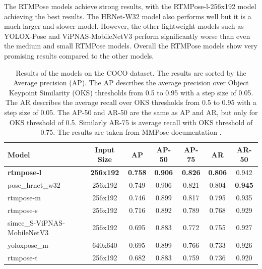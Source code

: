 The RTMPose models achieve strong results, with the RTMPose-l-256x192 model achieving the best results. The HRNet-W32 model also performs well but it is a much larger and slower model. However, the other lightweight models such as YOLOX-Pose and ViPNAS-MobileNetV3 perform significantly worse than even the medium and small RTMPose models. Overall the RTMPose models show very promising results compared to the other models.

\begin{table}[htbp]
    \setlength{\tabcolsep}{4pt}
    \centering
    \begin{tabular}{lcccccc}
        \toprule
        \textbf{Model}              & \textbf{Input Size} & \textbf{AP}    & \textbf{AP-50} & \textbf{AP-75} & \textbf{AR}    & \textbf{AR-50} \\
        \midrule
        \textbf{rtmpose-l}          & \textbf{256x192}    & \textbf{0.758} & \textbf{0.906} & \textbf{0.826} & \textbf{0.806} & 0.942          \\
        pose\_hrnet\_w32            & 256x192             & 0.749          & 0.906          & 0.821          & 0.804          & \textbf{0.945} \\
        rtmpose-m                   & 256x192             & 0.746          & 0.899          & 0.817          & 0.795          & 0.935          \\
        rtmpose-s                   & 256x192             & 0.716          & 0.892          & 0.789          & 0.768          & 0.929          \\
        simcc\_S-ViPNAS-MobileNetV3 & 256x192             & 0.695          & 0.883          & 0.772          & 0.755          & 0.927          \\
        yoloxpose\_m                & 640x640             & 0.695          & 0.899          & 0.766          & 0.733          & 0.926          \\
        rtmpose-t                   & 256x192             & 0.682          & 0.883          & 0.759          & 0.736          & 0.920          \\


        \bottomrule
    \end{tabular}
    \caption{Results of the models on the COCO dataset. The results are sorted by the Average precision (AP). The AP describes the average precision over Object Keypoint Similarity (OKS) thresholds from 0.5 to 0.95 with a step size of 0.05. The AR describes the average recall over OKS thresholds from 0.5 to 0.95 with a step size of 0.05. The AP-50 and AR-50 are the same as AP and AR, but only for OKS threshold of 0.5. Similarly AR-75 is average recall with OKS threshold of 0.75. The results are taken from MMPose documentation \cite{mmpose2020}.}
    \label{tab:evaluation_results_coco}

\end{table}




